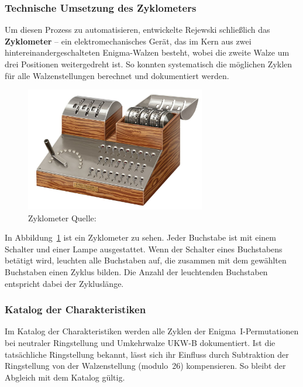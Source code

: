 \documentclass[12pt, ngerman, a4paper, numbers=noenddot]{article}
\begin{document}
\newpage
\subsubsection{Technische Umsetzung des Zyklometers}

Um diesen Prozess zu automatisieren, entwickelte Rejewski schließlich das \textbf{Zyklometer} – ein elektromechanisches Gerät, das im Kern aus zwei hintereinandergeschalteten Enigma-Walzen besteht, wobei die zweite Walze um drei Positionen weitergedreht ist. So konnten systematisch die möglichen Zyklen für alle Walzenstellungen berechnet und dokumentiert werden.


\begin{figure}[H]
	\centering
	\includegraphics[width=0.7\textwidth]{bilder/Zyklometer.jpg}
	\caption{Zyklometer Quelle: \cite{wiki:zyklometer}}
	\label{fig:Zyklometer}
\end{figure}

In Abbildung~\ref{fig:Zyklometer} ist ein Zyklometer zu sehen. Jeder Buchstabe ist mit einem Schalter und einer Lampe ausgestattet. Wenn der Schalter eines Buchstabens betätigt wird, leuchten alle Buchstaben auf, die zusammen mit dem gewählten Buchstaben einen Zyklus bilden. Die Anzahl der leuchtenden Buchstaben entspricht dabei der Zykluslänge.






\subsubsection{Katalog der Charakteristiken}

Im Katalog der Charakteristiken werden alle Zyklen der Enigma~I-Permutationen bei neutraler Ringstellung und Umkehrwalze UKW-B dokumentiert. Ist die tatsächliche Ringstellung bekannt, lässt sich ihr Einfluss durch Subtraktion der Ringstellung von der Walzenstellung (modulo~26) kompensieren. So bleibt der Abgleich mit dem Katalog gültig.
\end{document}
